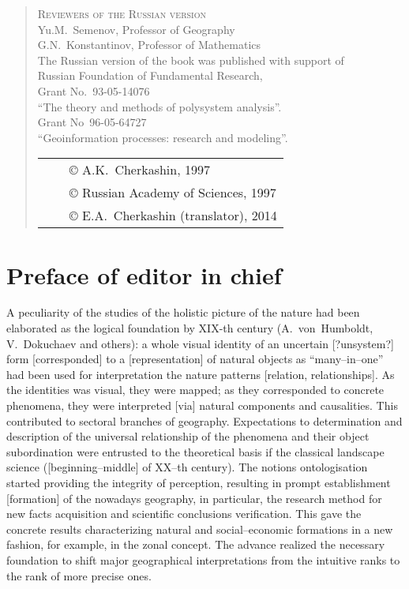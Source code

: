 \documentclass[12pt,leqno]{book}
\numberwithin{equation}{chapter}
\begin{document}
\begin{quote}
\begin{center}
\textsc{Reviewers of the Russian version}\\{}
Yu.M.~Semenov, Professor of Geography\\{}
G.N.~Konstantinov, Professor of Mathematics\\{}
\vspace{1em}
The Russian version of the book was published with support of\\{} Russian Foundation of Fundamental Research,\\{}
Grant No.~93-05-14076\\{}
``The theory and methods of polysystem analysis''.\\{}
Grant No~96-05-64727\\{}
``Geoinformation processes: research and modeling''.
\end{center}
\vfill{}
\begin{tabular}{lcl}
{}\hspace{0.4\linewidth}{} & & \copyright{} A.K.~Cherkashin, 1997\\
& & \copyright{} Russian Academy of Sciences, 1997\\
& & \copyright{} E.A.~Cherkashin (translator), 2014
\end{tabular}
\end{quote}

\tableofcontents

\chapter*{Preface of editor in chief}\normalsize
\pagestyle{plain}



A peculiarity of the studies of the holistic picture of the nature had been elaborated as the logical foundation by XIX-th century (A.~von~Humboldt, V.~Dokuchaev and others): a whole visual identity of an uncertain [?unsystem?] form [corresponded] to a [representation] of natural objects as ``many--in--one'' had been used for interpretation the nature patterns [relation, relationships]. As the identities was visual, they were mapped; as they corresponded to concrete phenomena, they were interpreted [via] natural components and causalities. This contributed to sectoral branches of geography. Expectations to determination and description of the universal relationship of the phenomena and their object subordination were entrusted to the theoretical basis if the classical landscape science ([beginning--middle] of XX--th century). The notions ontologisation started providing the integrity of perception, resulting in prompt establishment [formation] of the nowadays geography, in particular, the research method for new facts acquisition and scientific conclusions verification. This gave the concrete results characterizing natural and social--economic formations in a new fashion, for example, in the zonal concept. The advance realized the necessary foundation to shift major geographical interpretations from the intuitive ranks to the rank of more precise ones.
\end{document}
